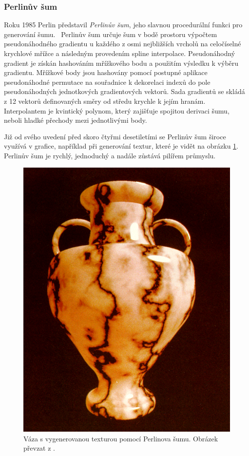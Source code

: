 \subsubsection{Perlinův šum}
\label{perlinNoise}
Roku 1985 Perlin představil \textit{Perlinův šum}, jeho slavnou procedurální funkci pro generování šumu.~\cite{PerlinKen, Perlin2002ImprovingN} Perlinův šum určuje šum v bodě prostoru výpočtem pseudonáhodného gradientu u každého z osmi nejbližších vrcholů na celočíselné krychlové mřížce a následným provedením spline interpolace. Pseudonáhodný gradient je získán hashováním mřížkového bodu a použitím výsledku k výběru gradientu. Mřížkové body jsou hashovány pomocí postupné aplikace pseudonáhodné permutace na souřadnice k dekorelaci indexů do pole pseudonáhodných jednotkových gradientových vektorů. Sada gradientů se skládá z 12 vektorů definovaných směry od středu krychle k jejím hranám. Interpolantem je kvintický polynom, který zajišťuje spojitou derivaci šumu, neboli hladké přechody mezi jednotlivými body.

Již od svého uvedení před skoro čtyřmi desetiletími se Perlinův šum široce využívá v grafice, například při generování textur, které je vidět na obrázku \ref{PerlinVase}. Perlinův šum je rychlý, jednoduchý a nadále zůstává pilířem průmyslu.

\begin{figure}[H]
	\centering
	\includegraphics[scale=0.3]{obrazky-figures/PerlinNoiseVase.png}
	\caption{Váza s vygenerovanou texturou pomocí Perlinova šumu. Obrázek převzat z \cite{PerlinKen}.}
	\label{PerlinVase}
\end{figure}

